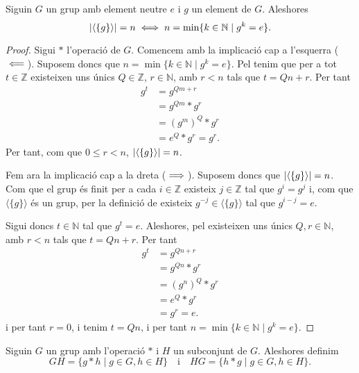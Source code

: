 \documentclass[../../Main.tex]{subfiles}
\begin{document}
	\begin{proposition}
		\label{prop:potencia element neutre en un grup}
		Siguin \(G\) un grup amb element neutre \(e\) i \(g\) un element de \(G\). Aleshores
		\[\abs{\langle\{g\}\rangle}=n\sii n=\min\{k\in\mathbb{N}\mid g^{k}=e\}.\]
		\begin{proof}
			Sigui \(\ast\) l'operació de \(G\). Comencem amb la implicació cap a l'esquerra (\(\impliedby\)). Suposem doncs que \(n=\min\{k\in\mathbb{N}\mid g^{k}=e\}\). Pel  tenim que per a tot \(t\in\mathbb{Z}\) existeixen uns únics \(Q\in\mathbb{Z}\), \(r\in\mathbb{N}\), amb \(r<n\) tals que \(t=Qn+r\). Per tant
			\begin{align*}
			g^{t}&=g^{Qm+r}\\
			&=g^{Qm}\ast g^{r}\\
			&=(g^{m})^{Q}\ast g^{r}\\
			&=e^{Q}\ast g^{r}=g^{r}.
			\end{align*}
			Per tant, com que \(0\leq r<n\), \(\abs{\langle\{g\}\rangle}=n\).
			
			Fem ara la implicació cap a la dreta (\(\implies\)). Suposem doncs que \(\abs{\langle\{g\}\rangle}=n\). Com que el grup és finit per a cada \(i\in\mathbb{Z}\) existeix \(j\in\mathbb{Z}\) tal que \(g^{i}=g^{j}\) i, com que \(\langle\{g\}\rangle\) és un grup, per la definició de  existeix \(g^{-j}\in\langle\{g\}\rangle\) tal que \(g^{i-j}=e\).
			
			Sigui doncs \(t\in\mathbb{N}\) tal que \(g^{t}=e\). Aleshores, pel  existeixen uns únics \(Q,r\in\mathbb{N}\), amb \(r<n\) tals que \(t=Qn+r\). Per tant
			\begin{align*}
			g^{t}&=g^{Qn+r}\\
			&=g^{Qn}\ast g^{r}\\
			&=(g^{n})^{Q}\ast g^{r}\\
			&=e^{Q}\ast g^{r}\\
			&=g^{r}=e.
			\end{align*}
			i per tant \(r=0\), i tenim \(t=Qn\), i per tant \(n=\min\{k\in\mathbb{N}\mid g^{k}=e\}\).
		\end{proof}
	\end{proposition}
	\begin{definition}
		\label{def:conjugació entre conjunts sobre grups}
		Siguin \(G\) un grup amb l'operació \(\ast\) i \(H\) un subconjunt de \(G\). Aleshores definim
		\[GH=\{g\ast h\mid g\in G,h\in H\}\quad\text{i}\quad HG=\{h\ast g\mid g\in G,h\in H\}.\]
	\end{definition}
\end{document}
